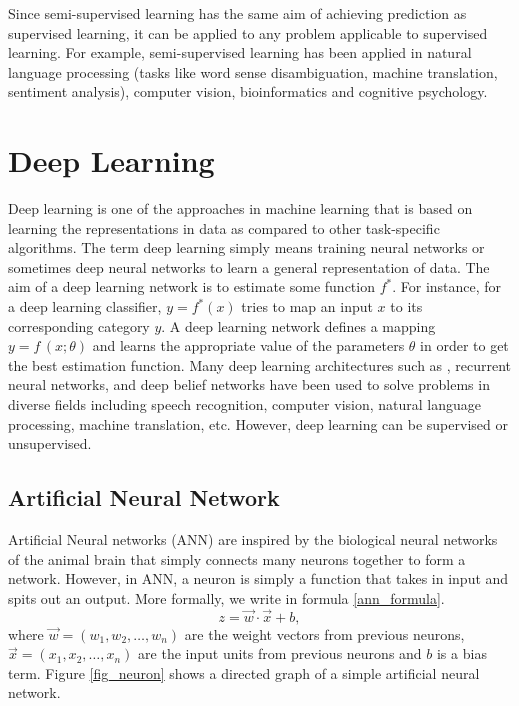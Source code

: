 \documentclass[master]{thesis-uestc}
\begin{document}
Since semi-supervised learning has the same aim of achieving prediction as supervised learning, it can be applied to any problem applicable to supervised learning. For example, semi-supervised learning has been applied in natural language processing (tasks like word sense disambiguation\cite{yarowsky13}, machine translation, sentiment analysis), computer vision, bioinformatics and cognitive psychology.

\section{Deep Learning}
Deep learning is one of the approaches in machine learning that is based on learning the representations in data as compared to other task-specific algorithms. The term deep learning simply means training neural networks or sometimes deep neural networks to learn a general representation of data. The aim of a deep learning network is to estimate some function $f^*$. For instance, for a deep learning classifier, $y = f^*(x)$ tries to map an input $x$ to its corresponding category $y$. A deep learning network defines a mapping $y = f\,(x;\theta)$ and learns the appropriate value of the parameters $\theta$ in order to get the best estimation function. Many deep learning architectures such as \cite{Ivanovsky-2017, Kri12, Chr14}, recurrent neural networks\cite{7914752, 7801769}, and deep belief networks\cite{7111524, 7539822} have been used to solve problems in diverse fields including speech recognition, computer vision, natural language processing, machine translation, etc. However, deep learning can be supervised or unsupervised.

\subsection{Artificial Neural Network}
Artificial Neural networks (ANN) are inspired by the biological neural networks of the animal brain that simply connects many neurons together to form a network. However, in ANN, a neuron is simply a function that takes in input and spits out an output. More formally, we write in formula \ref{ann_formula}. 
\begin{equation}
    z = \vec{w} \cdot \vec{x} + b,
\label{ann_formula}
\end{equation}
where $\vec{w} = (w_1, w_2, \dots, w_n)$ are the weight vectors from previous neurons, $\vec{x} = (x_1, x_2, \dots, x_n)$ are the input units from previous neurons and $b$ is a bias term. Figure \ref{fig_neuron} shows a directed graph of a simple artificial neural network.
\end{document}
